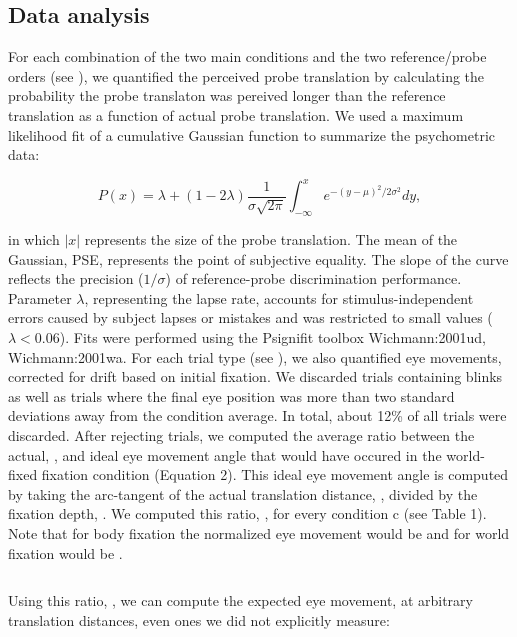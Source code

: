 \subsection{Data analysis}

For each combination of the two main conditions and the two reference/probe orders (see ), we quantified the perceived probe translation by calculating the probability the probe translaton was pereived longer than the reference translation as a function of actual probe translation. We used a maximum likelihood fit of a cumulative Gaussian function to summarize the psychometric data:

\begin{equation}
\label{p4:eq1}
P(x) = \lambda + (1 - 2\lambda) \frac{1}{\sigma \sqrt{2\pi}} \int_{-\infty}^{x}{e^{-(y-\mu)^2 / 2\sigma^2}}dy,
\end{equation}

in which $|x|$ represents the size of the probe translation. The mean of the Gaussian, PSE, represents the point of subjective equality. The slope of the curve reflects the precision ($1/\sigma$) of reference-probe discrimination performance. Parameter $\lambda$, representing the lapse rate, accounts for stimulus-independent errors caused by subject lapses or mistakes and was restricted to small values ($\lambda < 0.06$). Fits were performed using the Psignifit toolbox {Wichmann:2001ud, Wichmann:2001wa}.
For each trial type (see ), we also quantified eye movements, corrected for drift based on initial fixation. We discarded trials containing blinks as well as trials where the final eye position was more than two standard deviations away from the condition average. In total, about 12\% of all trials were discarded. After rejecting trials, we computed the average ratio between the actual, , and ideal eye movement angle that would have occured in the world-fixed fixation condition (Equation 2). This ideal eye movement angle is computed by taking the arc-tangent of the actual translation distance, , divided by the fixation depth, . We computed this ratio, , for every condition c (see Table 1). Note that for body fixation the normalized eye movement would be  and for world fixation would be .

\begin{equation}
\label{p4:eq2}
\end{equation}

Using this ratio, , we can compute the expected eye movement,  at arbitrary translation distances, even ones we did not explicitly measure:

